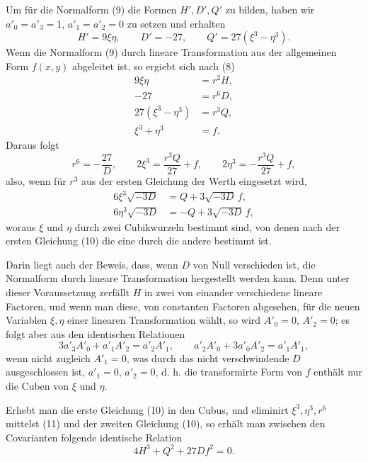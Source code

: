 \documentclass[11pt]{article}
\begin{document}
Um für die Normalform (9) die Formen $H',D',Q'$ zu bilden, haben wir $a'_0=a'_3=1$, $a'_1=a'_2=0$ zu setzen und erhalten
\[
 H'=9\xi\eta,
 \qquad D'=-27,
 \qquad Q'=27(\xi^3-\eta^3).
\]
Wenn die Normalform (9) durch lineare Transformation aus der allgemeinen Form $f(x,y)$ abgeleitet ist, so ergiebt sich nach (8)
\begin{equation}
\begin{aligned}
 9\xi\eta&=r^2H,\\
 -27&=r^6D,\\
 27(\xi^3-\eta^3)&=r^3Q,\\
 \xi^3+\eta^3&=f.
\end{aligned}
\tag{10}
\end{equation}
Daraus folgt
\[
 r^6=-\frac{27}{D},
 \qquad
 2\xi^3=\frac{r^3Q}{27}+f,
 \qquad
 2\eta^3=-\frac{r^3Q}{27}+f,
\]
also, wenn für $r^3$ aus der ersten Gleichung der Werth eingesetzt wird,
\begin{equation}
\begin{aligned}
 6\xi^3\sqrt{-3D}&=Q+3\sqrt{-3D}\,f,\\
 6\eta^3\sqrt{-3D}&=-Q+3\sqrt{-3D}\,f,
\end{aligned}
\tag{11}
\end{equation}
woraus $\xi$ und $\eta$ durch zwei Cubikwurzeln bestimmt sind, von denen nach der ersten Gleichung (10) die eine durch die andere bestimmt ist.

Darin liegt auch der Beweis, dass, wenn $D$ von Null verschieden ist, die Normalform durch lineare Transformation hergestellt werden kann. Denn unter dieser Voraussetzung zerfällt $H$ in zwei von einander verschiedene lineare Factoren, und wenn man diese, von constanten Factoren abgesehen, für die neuen Variablen $\xi,\eta$ einer linearen Transformation wählt, so wird $A'_0=0$, $A'_2=0$; es folgt aber aus den identischen Relationen
\[
 3a'_3A'_0+a'_1A'_2=a'_2A'_1,
 \qquad
 a'_2A'_0+3a'_0A'_2=a'_1A'_1,
\]
wenn nicht zugleich $A'_1=0$, was durch das nicht verschwindende $D$ ausgeschlossen ist, $a'_1=0$, $a'_2=0$, d. h. die transformirte Form von $f$ enthält nur die Cuben von $\xi$ und $\eta$.

Erhebt man die erste Gleichung (10) in den Cubus, und eliminirt $\xi^3,\eta^3,r^6$ mittelst (11) und der zweiten Gleichung (10), so erhält man zwischen den Covarianten folgende identische Relation
\begin{equation}
 4H^3+Q^2+27Df^2=0.
\tag{12}
\end{equation}
\end{document}
